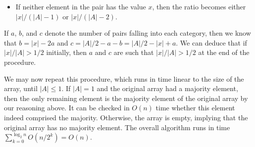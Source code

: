 \documentclass[a4paper,12pt]{article}
\begin{document}
\begin{enumerate}
\begin{itemize}
            \item
                If neither element in the pair has the value $x$, then the ratio becomes either $|x|/(|A| - 1)$ or $|x|/(|A| - 2)$.
        \end{itemize}
        If $a$, $b$, and $c$ denote the number of pairs falling into each category, then we know that $b = |x| - 2a$ and $c = |A|/2 - a - b = |A|/2 - |x| + a$. We can deduce that if $|x|/|A| > 1/2$ initially, then $a$ and $c$ are such that $|x|/|A| > 1/2$ at the end of the procedure. \par
        We may now repeat this procedure, which runs in time linear to the size of the array, until $|A| \leq 1$. If $|A| = 1$ and the original array had a majority element, then the only remaining element is the majority element of the original array by our reasoning above. It can be checked in $O(n)$ time whether this element indeed comprised the majority. Otherwise, the array is empty, implying that the original array has no majority element. The overall algorithm runs in time $\sum_{k = 0}^{\log_2 n} O(n/2^k) = O(n)$.


\end{enumerate}
\end{document}
